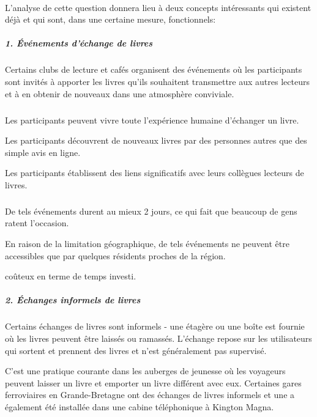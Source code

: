 \paragraph*{}
L'analyse de cette question donnera lieu à deux concepts intéressants qui existent déjà et qui sont, dans une certaine mesure, fonctionnels:

\subparagraph{{\large 1. Événements d'échange de livres}\medskip\\}

Certains clubs de lecture et cafés organisent des événements où les participants sont invités à apporter les livres qu'ils souhaitent transmettre aux autres lecteurs et à en obtenir de nouveaux dans une atmosphère conviviale.

\subparagraph*{}
\begin{list}{•}{\textbf{Avantages}}
	\item Les participants peuvent vivre toute l'expérience humaine d'échanger un livre.
	\item Les participants découvrent de nouveaux livres par des personnes autres que des simple avis en ligne.
	\item Les participants établissent des liens significatifs avec leurs collègues lecteurs de livres.
\end{list}

\subparagraph*{}
\begin{list}{•}{\textbf{Inconvénients}}
	\item De tels événements durent au mieux 2 jours, ce qui fait que beaucoup de gens ratent l'occasion.
	\item En raison de la limitation géographique, de tels événements ne peuvent être accessibles que par quelques résidents proches de la région.
	\item coûteux en terme de temps investi.
\end{list}

\newpage

\subparagraph{{\large 2. Échanges informels de livres}\medskip\\}

Certains échanges de livres sont informels - une étagère ou une boîte est fournie où les livres peuvent être laissés ou ramassés. L'échange repose sur les utilisateurs qui sortent et prennent des livres et n'est généralement pas supervisé.\medskip

C'est une pratique courante dans les auberges de jeunesse où les voyageurs peuvent laisser un livre et emporter un livre différent avec eux. Certaines gares ferroviaires en Grande-Bretagne ont des échanges de livres informels et une a également été installée dans une cabine téléphonique à Kington Magna\cite{noauthor_book_2019}.

